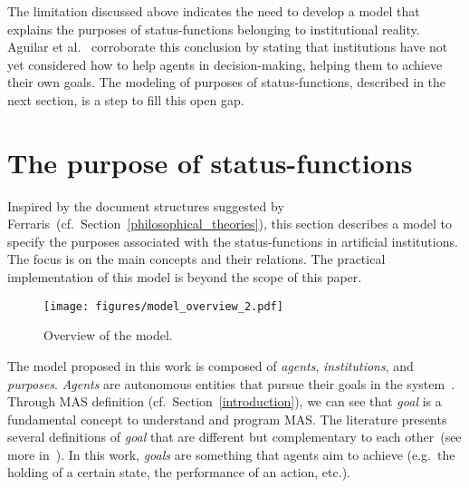 \documentclass[runningheads]{llncs}
\begin{document}
The limitation discussed above indicates the need to develop a model that explains the purposes of status-functions belonging to institutional reality.
Aguilar et al.~\cite{Rodriguez-Aguilar2015} corroborate this conclusion by stating that institutions have not yet considered how to help agents in decision-making, helping them to achieve their own goals.
The modeling of purposes of status-functions, described in the next section, is a step to fill this open gap.


\section{The purpose of status-functions}
\label{model}

Inspired by the document structures suggested by Ferraris~(cf.~Section~\ref{philosophical_theories}), this section describes a model to specify the purposes associated with the status-functions in artificial institutions. The focus is on the main concepts and their relations. %
The practical implementation of this model is beyond the scope of this paper.


\begin{figure*}[!ht]\centering 
	\texttt{[image: figures/model\_overview\_2.pdf]}
	\caption{Overview of the model.}
	\label{fig:overview_model}
\end{figure*}



The model proposed in this work is composed of \emph{agents}, \emph{institutions}, and \emph{purposes}.
\emph{Agents} are autonomous entities that pursue their goals in the system~\cite{wooldridge2009introduction}. 
Through MAS definition (cf.~Section~\ref{introduction}), we can see that \emph{goal} is a fundamental concept to understand and program MAS. 
The literature presents several definitions of \emph{goal} that are different but complementary to each other~(see more in~\cite{boissier2020multi,winikoff2002declarative,hindriks2000agent,van2003agent,hubner2006declarative,nigam2006dynamic}). In this work, \emph{goals} are something that agents aim to achieve (e.g.~the holding of a certain state, the performance of an action, etc.). 
\end{document}
